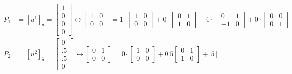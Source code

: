 \documentclass[letterpaper]{article}
\begin{document}
    \begin{align*}
       {P}_{1}&=[{u}^{1}]_{ \bar{u} }=\left[ \begin{array}{c}
            1\\
            0\\
            0\\
            0
        \end{array}\right]   \leftrightarrow \left[ \begin{array}{cc}
            1 & 0\\
            0 & 0
            \end{array} \right] = 1 \cdot  \left[\begin{array}{cc}
            1 & 0\\
            0 & 0
            \end{array} \right]+ 0 \cdot \left[\begin{array}{cc}
            0 & 1\\
            1 & 0
            \end{array} \right] + 0 \cdot \left[\begin{array}{cc}
            0 & 1\\
            -1 & 0
            \end{array} \right] + 0 \cdot \left[\begin{array}{cc}
            0 & 0\\
            0 & 1
        \end{array} \right]
\\
        {P}_{2}&=[{u}^{2}]_{ \bar{u}}=\left[\begin{array}{c}
            0\\
            .5\\
           .5\\
            0
        \end{array}\right] \leftrightarrow \left[ \begin{array}{cc}
            0& 1\\
            0 & 0
            \end{array} \right] = 0 \cdot  \left[\begin{array}{cc}
            1 & 0\\
            0 & 0
            \end{array} \right]+ 0.5  \left[\begin{array}{cc}
            0 & 1\\
            1 & 0
            \end{array} \right] + .5  \left[\begin{array}{cc}

\end{array}
\end{align*}
\end{document}
